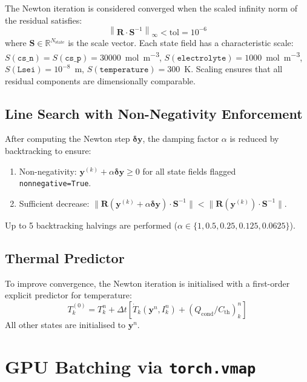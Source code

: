 The Newton iteration is considered converged when the scaled infinity norm of the residual satisfies:
\begin{equation}
  \left\|\mathbf{R} \cdot \mathbf{S}^{-1}\right\|_\infty < \text{tol} = 10^{-6}
  \label{eq:newton_conv}
\end{equation}
where $\mathbf{S} \in \mathbb{R}^{N_\text{state}}$ is the scale vector. Each state field has a characteristic scale: $S(\texttt{cs\_n}) = S(\texttt{cs\_p}) = 30000$~\si{\mol\per\meter\cubed}, $S(\texttt{electrolyte}) = 1000$~\si{\mol\per\meter\cubed}, $S(\texttt{Lsei}) = 10^{-8}$~m, $S(\texttt{temperature}) = 300$~K. Scaling ensures that all residual components are dimensionally comparable.

\subsection{Line Search with Non-Negativity Enforcement}

After computing the Newton step $\boldsymbol{\delta y}$, the damping factor $\alpha$ is reduced by backtracking to ensure:
\begin{enumerate}
  \item Non-negativity: $\mathbf{y}^{(k)} + \alpha \boldsymbol{\delta y} \geq 0$ for all state fields flagged \texttt{nonnegative=True}.
  \item Sufficient decrease: $\|\mathbf{R}(\mathbf{y}^{(k)} + \alpha \boldsymbol{\delta y}) \cdot \mathbf{S}^{-1}\| < \|\mathbf{R}(\mathbf{y}^{(k)}) \cdot \mathbf{S}^{-1}\|$.
\end{enumerate}
Up to 5 backtracking halvings are performed ($\alpha \in \{1, 0.5, 0.25, 0.125, 0.0625\}$).

\subsection{Thermal Predictor}

To improve convergence, the Newton iteration is initialised with a first-order explicit predictor for temperature:
\begin{equation}
  T_k^{(0)} = T_k^n + \Delta t \left[\dot{T}_k(\mathbf{y}^n, I_k^n) + (Q_\text{cond}/C_\text{th})_k^n \right]
  \label{eq:thermal_predictor}
\end{equation}
All other states are initialised to $\mathbf{y}^n$.

\section{GPU Batching via \texttt{torch.vmap}}
\label{sec:vmap}

